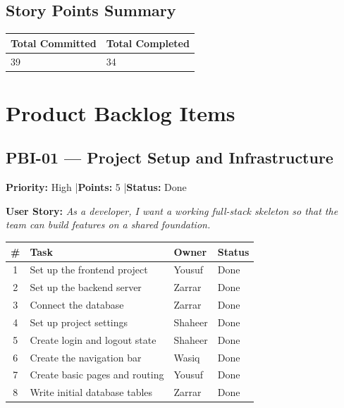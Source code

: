 \documentclass[12pt,a4paper]{article}
\begin{document}
\vspace{1.5em}

\subsection*{Story Points Summary}
\begin{tabularx}{0.6\textwidth}{|X|X|}
\hline
\rowcolor{headerbg}\color{white}\bfseries Total Committed & \color{white}\bfseries Total Completed \\ \hline
39 & 34 \\ \hline
\end{tabularx}

\vspace{2em}

\section{Product Backlog Items}

\subsection*{PBI-01 --- Project Setup and Infrastructure}
\textbf{Priority:} High \quad|\quad \textbf{Points:} 5 \quad|\quad \textbf{Status:} Done

\vspace{0.3em}
\textbf{User Story:} \textit{As a developer, I want a working full-stack skeleton so that the team can build features on a shared foundation.}

\vspace{0.5em}
\noindent\renewcommand{\arraystretch}{1.3}
\begin{tabularx}{\textwidth}{|c|X|l|l|}
\hline
\rowcolor{headerbg}\color{white}\bfseries \# & \color{white}\bfseries Task & \color{white}\bfseries Owner & \color{white}\bfseries Status \\ \hline
1 & Set up the frontend project & Yousuf & Done \\ \hline
\rowcolor{rowgray} 2 & Set up the backend server & Zarrar & Done \\ \hline
3 & Connect the database & Zarrar & Done \\ \hline
\rowcolor{rowgray} 4 & Set up project settings & Shaheer & Done \\ \hline
5 & Create login and logout state & Shaheer & Done \\ \hline
\rowcolor{rowgray} 6 & Create the navigation bar & Wasiq & Done \\ \hline
7 & Create basic pages and routing & Yousuf & Done \\ \hline
\rowcolor{rowgray} 8 & Write initial database tables & Zarrar & Done \\ \hline
\end{tabularx}
\end{document}

